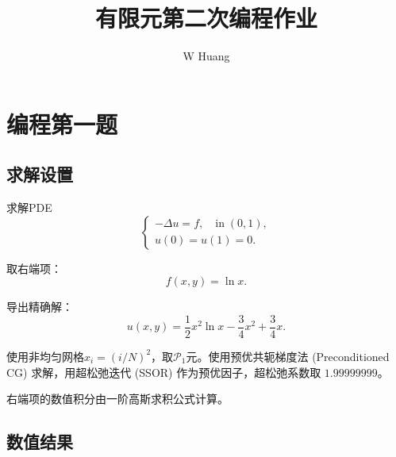 \documentclass[lang=cn,11pt,a4paper]{elegantpaper}
\title{有限元第二次编程作业}
\author{W Huang}
\date{\zhtoday}
\begin{document}
\maketitle

\section{编程第一题}

\subsection{求解设置}

求解PDE
\begin{equation}
    \left\{
        \begin{array}{l}
            -\Delta u = f,\quad \text{in}\;(0,1),\\
            u(0) = u(1) = 0.
        \end{array}
    \right.
\end{equation}

取右端项：
\begin{equation}
    f(x,y)=\ln x.
\end{equation}

导出精确解：
\begin{equation}
    u(x,y)=\frac{1}{2}x^2\ln x - \frac{3}{4}x^2 + \frac{3}{4}x.
\end{equation}

使用非均匀网格$x_i=(i/N)^2$，取$\mathcal{P}_1$元。使用预优共轭梯度法 (Preconditioned CG) 求解，用超松弛迭代 (SSOR) 作为预优因子，超松弛系数取 $1.99999999$。

右端项的数值积分由一阶高斯求积公式计算。

\subsection{数值结果}
\end{document}
